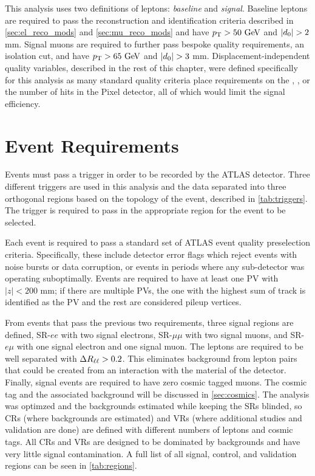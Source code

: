 This analysis uses two definitions of leptons: \emph{baseline} and \emph{signal}. Baseline leptons are required to pass the reconstruction and identification criteria described in \autoref{sec:el_reco_mods} and \autoref{sec:mu_reco_mods} and have $\pt > 50 \GeV$ and $|d_0| > 2$ mm. Signal muons are required to further pass bespoke quality requirements, an isolation cut, and have $\pt > 65 \GeV$ and $|d_0| > 3$ mm. Displacement-independent quality variables, described in the rest of this chapter, were defined specifically for this analysis as many standard quality criteria place requirements on the \absdz, \absz, or the number of hits in the Pixel detector, all of which would limit the signal efficiency. 

\section{Event Requirements}

Events must pass a trigger in order to be recorded by the \ac{ATLAS} detector. Three different triggers are used in this analysis and the data separated into three orthogonal regions based on the topology of the event, described in \autoref{tab:triggers}. The trigger is required to pass in the appropriate region for the event to be selected.

Each event is required to pass a standard set of \ac{ATLAS} event quality preselection criteria. Specifically, these include detector error flags which reject events with noise bursts or data corruption, or events in periods where any sub-detector was operating suboptimally. Events are required to have at least one \ac{PV} with $|z| < 200$ mm; if there are multiple \ac{PV}s, the one with the highest sum of track \pt is identified as the \ac{PV} and the rest are considered pileup vertices. 

From events that pass the previous two requirements, three signal regions are defined, SR-$ee$ with two signal electrons, SR-$\mu\mu$ with two signal muons, and SR-$e\mu$ with one signal electron and one signal muon. The leptons are required to be well separated with $\Delta R_{\ell\ell} > 0.2$. This eliminates background from lepton pairs that could be created from an interaction with the material of the detector. Finally, signal events are required to have zero cosmic tagged muons. The cosmic tag and the associated background will be discussed in \autoref{sec:cosmics}. The analysis was optimzed and the backgrounds estimated while keeping the \acp{SR} blinded, so \acp{CR} (where backgrounds are estimated) and \acp{VR} (where additional studies and validation are done) are defined with different numbers of leptons and cosmic tags. All \acp{CR} and \acp{VR} are designed to be dominated by backgrounds and have very little signal contamination. A full list of all signal, control, and validation regions can be seen in \autoref{tab:regions}. 


